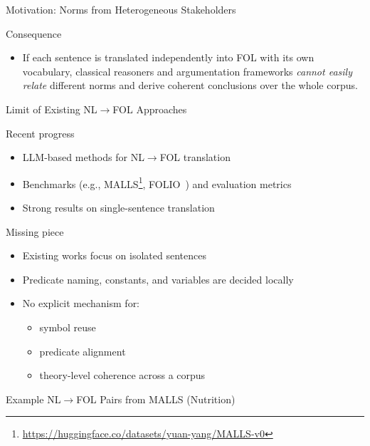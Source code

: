 \documentclass[presentation]{beamer}
\begin{document}
{\begin{frame}{Motivation: Norms from Heterogeneous Stakeholders}
\begin{block}{Consequence}
\begin{itemize}
    \item If each sentence is translated independently into FOL with its own vocabulary,
          classical reasoners and argumentation frameworks \emph{cannot easily relate} different norms
          and derive coherent conclusions over the whole corpus.
\end{itemize}
\end{block}

\end{frame}

\begin{frame}{Limit of Existing NL$\rightarrow$FOL Approaches}

\begin{block}{Recent progress}
\begin{itemize}
    \item LLM-based methods for NL$\rightarrow$FOL translation
    \item Benchmarks (e.g., MALLS\footnote{\url{https://huggingface.co/datasets/yuan-yang/MALLS-v0}}, FOLIO~\cite{DBLP:conf/emnlp/HanS0QRZCPQBSWS24}) and evaluation metrics
    \item Strong results on \alert{single-sentence} translation
\end{itemize}
\end{block}

\begin{block}{Missing piece}
\begin{itemize}
    \item Existing works focus on isolated sentences
    \item Predicate naming, constants, and variables are decided \alert{locally}
    \item No explicit mechanism for:
    \begin{itemize}
        \item symbol reuse
        \item predicate alignment
        \item theory-level coherence across a corpus
    \end{itemize}
\end{itemize}
\end{block}

\end{frame}

\begin{frame}{Example NL$\rightarrow$FOL Pairs from MALLS (Nutrition)}


\end{frame}}
\end{document}
